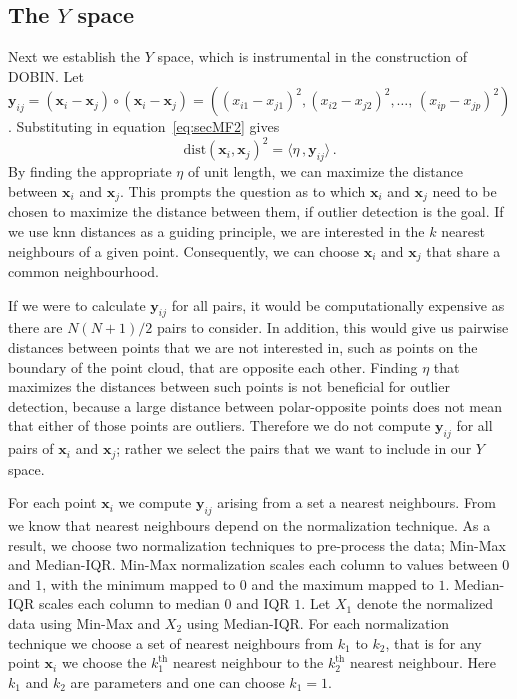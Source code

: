 \documentclass[a4paper,11pt]{article}
\newcommand{\dist}{\text{dist}}
\begin{document}
\subsection{The $Y$ space}\label{sec:MathFrame1}

Next we establish the $Y$ space, which is instrumental in the construction of DOBIN\@. Let $\bm{y}_{ij} = ( \bm{x}_i - \bm{x}_j )\circ ( \bm{x}_i - \bm{x}_j ) = \left( ( x_{i1} - x_{j1} )^2, ( x_{i2} - x_{j2} )^2, \dots, \, ( x_{ip} - x_{jp} )^2 \right)$. Substituting in equation~\eqref{eq:secMF2} gives
\begin{equation}\label{eq:secMF3}
	\dist(\bm{x}_i, \bm{x}_j)^2 = \langle \eta\, , \bm{y}_{ij} \rangle\, .
\end{equation}
By finding the appropriate $\eta$ of unit length, we can maximize the distance between $\bm{x}_i$ and $\bm{x}_j$. This prompts the question as to which $\bm{x}_i$ and $\bm{x}_j$ need to be chosen to maximize the distance between them, if outlier detection is the goal. If we use knn distances as a guiding principle, we are interested in the $k$ nearest neighbours of a given point. Consequently, we can choose $\bm{x}_i$ and $\bm{x}_j$ that share a common neighbourhood.

If we were to calculate $\bm{y}_{ij}$ for all pairs, it would be computationally expensive as there are $N(N+1)/2$ pairs to consider. In addition, this would give us pairwise distances between points that we are not interested in, such as points on the boundary of the point cloud, that are opposite each other. Finding $\eta$ that maximizes the distances between such points is not beneficial for outlier detection, because a large distance between polar-opposite points does not mean that either of those points are outliers. Therefore we do not compute $\bm{y}_{ij}$ for all pairs of $\bm{x}_i$ and $\bm{x}_j$; rather we select the pairs that we want to include in our $Y$ space.

For each point $\bm{x}_i$ we compute $\bm{y}_{ij}$ arising from a set a nearest neighbours. From \cite{kandanaarachchi2018normalization} we know that nearest neighbours depend on the normalization technique. As a result, we choose two normalization techniques to pre-process the data; Min-Max and Median-IQR. Min-Max normalization scales each column to values between $0$ and $1$, with the minimum mapped to $0$ and the maximum mapped to $1$. Median-IQR scales each column to median $0$ and IQR $1$. Let $X_1$ denote the normalized data using Min-Max and $X_2$ using Median-IQR. For each normalization technique we choose a set of nearest neighbours from $k_1$ to $k_2$, that is for any point $\bm{x}_i$ we choose the $k_1^{\text{th}}$ nearest neighbour to the $k_2^{\text{th}}$ nearest neighbour. Here $k_1$ and $k_2$ are parameters and one can choose $k_1 =1$.
\end{document}
